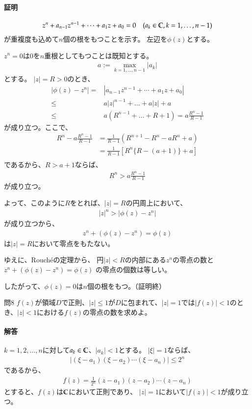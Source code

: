 \paragraph{証明}
\begin{align*}
    z^n+a_{n-1}z^{n-1}+\cdots+a_1z+a_0=0\quad(a_k\in\mathbb{C},k=1,\dots,n-1)
\end{align*}
が重複度も込めて$n$個の根をもつことを示す。
左辺を$\phi(z)$とする。

$z^n=0$は0を$n$重根としてもつことは既知とする。
\begin{align*}
    a:=\max_{k=1,\dots,n-1}|a_k|
\end{align*}
とする。
$|z|=R>0$のとき、
\begin{align*}
    |\phi(z)-z^n|=&|a_{n-1}z^{n-1}+\cdots+a_1z+a_0|\\
    \le&a|z|^{n-1}+\dots+a|z|+a\\
    \le&a(R^{n-1}+\dots+R+1)=a\frac{R^n-1}{R-1}
\end{align*}
が成り立つ。ここで、
\begin{align*}
    R^n-a\frac{R^n-1}{R-1}
    &=\frac{1}{R-1}(R^{n+1}-R^n-aR^n+a)\\
    &=\frac{1}{R-1}\left[R^{n}\{R-(a+1)\}+a\right]\\
\end{align*}
であるから、$R>a+1$ならば、
\begin{align*}
    R^n>a\frac{R^n-1}{R-1}
\end{align*}
が成り立つ。

よって、このように$R$をとれば、$|z|=R$の円周上において、
\begin{align*}
    |z|^n>|\phi(z)-z^n|
\end{align*}
が成り立つから、
\begin{align*}
    z^n+(\phi(z)-z^n)=\phi(z)
\end{align*}
は$|z|=R$において零点をもたない。

ゆえに、Rouch\'{e}の定理から、
円$|z|<R$の内部にある$z^n$の零点の数と\\
$z^n+(\phi(z)-z^n)=\phi(z)$
の零点の個数は等しい。

したがって、$\phi(z)=0$は$n$個の根をもつ。（証明終）


\newpage
\begin{mysimplebox}{問8}
    $f(z)$が領域$D$で正則、$|z|\le1$が$D$に包まれて、$|z|=1$では$|f(z)|<1$のとき、$|z|<1$における$f(z)$の零点の数を求めよ。
\end{mysimplebox}
\paragraph{解答}
$k=1,2,\dots,n$に対して$a_k\in\mathbb{C}$、$|a_k|<1$とする。
$|\xi|=1$ならば、
\begin{align*}
    |(\xi-a_1)(\xi-a_2)\cdots(\xi-a_n)|
    \le2^n
\end{align*}
であるから、
\begin{align*}
    f(z)=\frac{1}{2^n}(z-a_1)(z-a_2)\cdots(z-a_n)
\end{align*}
とすると、$f(z)$は$\mathbb{C}$において正則であり、
$|z|=1$において$|f(z)|<1$が成り立つ。

